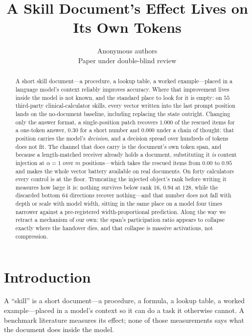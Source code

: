 \documentclass{article}
\title{A Skill Document's Effect Lives on Its Own Tokens}
\author{Anonymous authors \\
Paper under double-blind review}
\begin{document}
\maketitle

\begin{abstract}
A short skill document---a procedure, a lookup table, a worked example---placed
in a language model's context reliably improves accuracy. Where that improvement
lives inside the model is not known, and the standard place to look for it is
empty: on $55$ third-party clinical-calculator skills, every vector written into
the last prompt position lands on the no-document baseline, including replacing
the state outright. Changing only the answer format, a single-position patch
recovers $1.000$ of the rescued items for a one-token answer, $0.30$ for a short
number and $\mathbf{0.000}$ under a chain of thought: that position carries the
model's \emph{decision}, and a decision spread over hundreds of tokens does not
fit. The channel that does carry is the document's own token span, and because a
length-matched receiver already holds a document, substituting it \emph{is}
content injection at $\alpha=1$ over $m$ positions---which takes the rescued
items from $0.00$ to $0.95$ and makes the whole vector battery available on real
documents. On forty calculators every control is at the floor.
Truncating the injected object's rank before writing it measures how large it
is: nothing survives below rank $16$, $0.94$ at $128$, while the discarded
bottom $64$ directions recover nothing---and that number does not fall with
depth or scale with model width, sitting in the same place on a model four times narrower
against a pre-registered width-proportional prediction. Along the way we retract
a mechanism of our own: the span's participation ratio appears to collapse
exactly where the handover dies, and that collapse is massive activations, not
compression.
\end{abstract}

\section{Introduction}

A ``skill'' is a short document---a procedure, a formula, a lookup table, a
worked example---placed in a model's context so it can do a task it otherwise
cannot. A benchmark literature measures its effect; none of those measurements
says what the document does inside the model.
\end{document}
